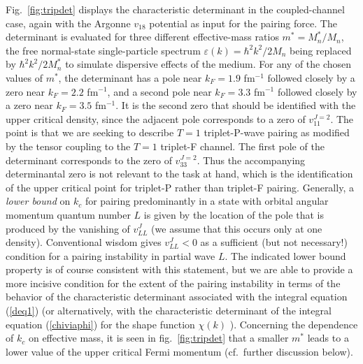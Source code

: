 Fig.~\ref{fig:tripdet} displays the characteristic determinant in 
the coupled-channel case, again with the Argonne $v_{18}$ potential 
as input for the pairing force.  The determinant is evaluated for 
three different effective-mass ratios $m^*=M_n^*/M_n$, the free 
normal-state single-particle spectrum $\varepsilon(k)=\hbar^2 k^2/2M_n$ 
being replaced by $\hbar^2 k^2/2M_n^*$ to simulate dispersive effects of 
the medium.  For any of the chosen values of $m^*$, the determinant 
has a pole near $k_F=1.9$ fm$^{-1}$ followed closely by a zero near 
$k_F=2.2$ fm$^{-1}$, and a second pole near $k_F=3.3$ fm$^{-1}$ 
followed closely by a zero near $k_F=3.5$ fm$^{-1}$.  It is the 
second zero that should be identified with the upper critical density,
since the adjacent pole corresponds to a zero of $v_{11}^{J=2}$.
The point is that we are seeking to describe $T=1$
triplet-P-wave pairing as modified by the tensor coupling to the
$T=1$ triplet-F channel.  The first pole of the determinant
corresponds to the zero of $v_{33}^{J=2}$.  Thus the accompanying
determinantal zero is not relevant to the task at hand, which
is the identification of the upper critical point for triplet-P
rather than triplet-F pairing.  Generally, a {\it lower bound} 
on $k_c$ for pairing predominantly in a state with orbital angular 
momentum quantum number $L$ is given by the location of the pole 
that is produced by the vanishing of $v^J_{LL}$ (we assume that
this occurs only at one density).   Conventional wisdom gives
$v^J_{LL}<0$ as a sufficient (but not necessary!) condition
for a pairing instability in partial wave $L$.  The indicated lower 
bound property is of course consistent with this statement, but we 
are able to provide a more incisive condition for the extent of the 
pairing instability in terms of the behavior of the characteristic 
determinant associated with the integral equation (\ref{deq1}) 
(or alternatively, with the characteristic determinant of the 
integral equation (\ref{chiviaphi}) for the shape function 
$\chi(k)$ \cite{luso,vvkthesis}).  Concerning the dependence
of $k_c$ on effective mass, it is seen in fig.~\ref{fig:tripdet}
that a smaller $m^*$ leads to a lower value of the upper critical 
Fermi momentum (cf.\ further discussion below).

